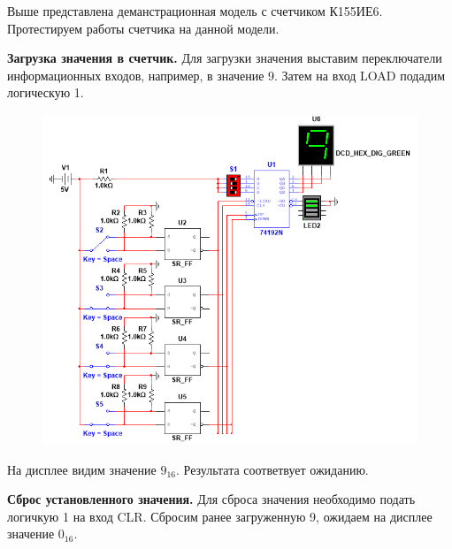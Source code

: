 Выше представлена деманстрационная модель с счетчиком К155ИЕ6. Протестируем работы счетчика на данной модели. \par

\newpage 

\textbf{Загрузка значения в счетчик.} Для загрузки значения выставим переключатели информационных входов,
например, в значение 9. Затем на вход LOAD подадим логическую 1.

\begin{figure}[h!]
    \centering
    \includegraphics[scale=0.8]{images/image-9.png}
    \label{image:9}
\end{figure}

На дисплее видим значение $9_{16}$. Результата соответвует ожиданию. \\[1mm]

\newpage

\textbf{Сброс установленного значения.} Для сброса значения необходимо подать логичкую 1 на вход CLR.
Сбросим ранее загруженную 9, ожидаем на дисплее значение $0_{16}$.\par


